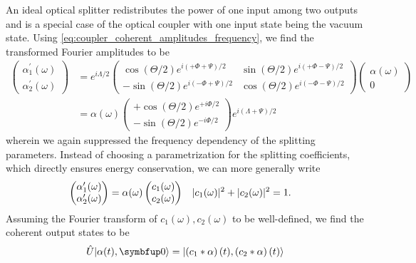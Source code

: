 An ideal optical splitter redistributes the power of one input among two outputs and is a special case of the optical coupler with one input state being the vacuum state.
Using \cref{eq:coupler_coherent_amplitudes_frequency}, we find the transformed Fourier amplitudes to be
\begin{equation}
	\begin{split}
		\begin{pmatrix}
			\alpha_1^\prime(\omega) \\
			\alpha_2^\prime(\omega)
		\end{pmatrix}
		&=
		e^{i\Lambda/2}
		\begin{pmatrix}
			\cos(\Theta/2)
			e^{i\left(+\Phi+\Psi\right)/2}
			&
			\sin(\Theta/2)
			e^{i\left(+\Phi-\Psi\right)/2}
			\\
			-
			\sin(\Theta/2)
			e^{i\left(-\Phi+\Psi\right)/2}
			&
			\cos(\Theta/2)
			e^{i\left(-\Phi-\Psi\right)/2}
		\end{pmatrix}
		\begin{pmatrix}
			\alpha(\omega) \\
			0
		\end{pmatrix}
		\\
		&=
		\alpha(\omega)
		\begin{pmatrix}
			+
			\cos(\Theta/2)
			e^{+i\Phi/2}
			\\
			-
			\sin(\Theta/2)
			e^{-i\Phi/2}
		\end{pmatrix}
		e^{i(\Lambda+\Psi)/2}
	\end{split}
\end{equation}
wherein we again suppressed the frequency dependency of the splitting parameters.
Instead of choosing a parametrization for the splitting coefficients, which directly ensures energy conservation, we can more generally write
\begin{align}
	\begin{pmatrix}
		\alpha_1^\prime(\omega) \\
		\alpha_2^\prime(\omega)
	\end{pmatrix}
	&=
	\alpha(\omega)
	\begin{pmatrix}
		c_1(\omega) \\
		c_2(\omega)
	\end{pmatrix}
	&
	\lvert c_1(\omega)\rvert^2
	+
	\lvert c_2(\omega)\rvert^2
	&=
	1
	.
\end{align}
Assuming the Fourier transform of $c_1(\omega),c_2(\omega)$ to be well-defined, we find the coherent output states to be
\begin{equation}
	\hat{U}
	\ket*{\alpha(t),\vb{0}}
	=
	\ket*{\left(c_1\conv\alpha\right)(t),\left(c_2\conv\alpha\right)(t)}
	\label{eq:splitter_state_convolution}
\end{equation}
